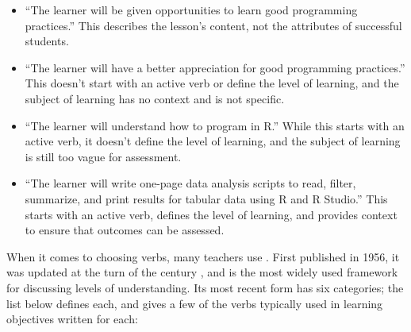 \begin{itemize}

\item
  ``The learner will be given opportunities to learn good programming
  practices.''  This describes the lesson's content, not the
  attributes of successful students.

\item
  ``The learner will have a better appreciation for good programming
  practices.''  This doesn't start with an active verb or define the
  level of learning, and the subject of learning has no context and is
  not specific.

\item
  ``The learner will understand how to program in R.''  While this
  starts with an active verb, it doesn't define the level of learning,
  and the subject of learning is still too vague for assessment.

\item
  ``The learner will write one-page data analysis scripts to read,
  filter, summarize, and print results for tabular data using R and R
  Studio.'' This starts with an active verb, defines the level of
  learning, and provides context to ensure that outcomes can be
  assessed.

\end{itemize}

When it comes to choosing verbs, many teachers use
.  First published in
1956, it was updated at the turn of the century \cite{Ande2001}, and
is the most widely used framework for discussing levels of
understanding.  Its most recent form has six categories; the list
below defines each, and gives a few of the verbs typically used in
learning objectives written for each:

